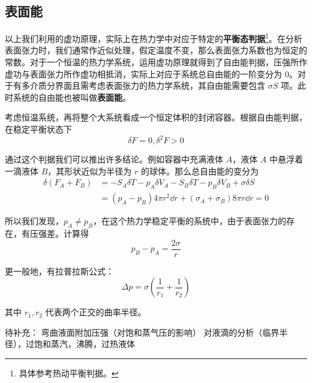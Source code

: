 \subsection{表面能}
以上我们利用的虚功原理，实际上在热力学中对应于特定的\textbf{平衡态判据}\footnote{具体参考热动平衡判据。}。在分析表面张力时，我们通常作近似处理，假定温度不变，那么表面张力系数也为恒定的常数。对于一个恒温的热力学系统，运用虚功原理就得到了自由能判据，压强所作虚功与表面张力所作虚功相抵消，实际上对应于系统总自由能的一阶变分为 $0$。对于有多介质分界面且需考虑表面张力的热力学系统，其自由能需要包含 $\sigma S$ 项。此时系统的自由能也被叫做\textbf{表面能}。

考虑恒温系统，再将整个大系统看成一个恒定体积的封闭容器。根据自由能判据，在稳定平衡状态下
\begin{equation}
\delta F=0,\delta^2 F>0
\end{equation}

通过这个判据我们可以推出许多结论。例如容器中充满液体 $A$，液体 $A$ 中悬浮着一滴液体 $B$，其形状近似为半径为 $r$ 的球体。那么总自由能的变分为
\begin{align}
\delta(F_A+F_B)&=-S_A\delta T-p_A\delta V_A-S_B\delta T-p_B\delta V_B+\sigma\delta S\\
&=(p_A-p_B)4\pi r^2\dd r + (\sigma_A+\sigma_B)8\pi r\dd r=0
\end{align}

所以我们发现，$p_A\neq p_B$，在这个热力学稳定平衡的系统中，由于表面张力的存在，有压强差。计算得
\begin{equation}
p_B-p_A=\frac{2\sigma}{r}
\end{equation}

更一般地，有拉普拉斯公式：
\begin{equation}\label{eq_sftens_1}
\Delta p = \sigma \left(\frac{1}{r_1}+\frac{1}{r_2}\right)
\end{equation}

其中 $r_1,r_2$ 代表两个正交的曲率半径。

待补充：
弯曲液面附加压强（对饱和蒸气压的影响）
对液滴的分析（临界半径），过饱和蒸汽，沸腾，过热液体